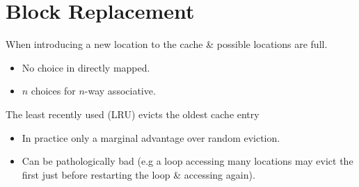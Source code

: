 \section{Block Replacement}
When introducing a new location to the cache \& possible locations are full.
\begin{itemize}
	\item No choice in directly mapped.
	\item $n$ choices for $n$-way associative.
\end{itemize}
The least recently used (LRU) evicts the oldest cache entry
\begin{itemize}
	\item In practice only a marginal advantage over random eviction.
	\item Can be pathologically bad (e.g a loop accessing many locations may evict the first just before restarting the loop \& accessing again).
\end{itemize}

